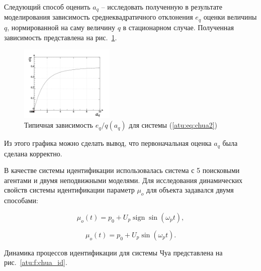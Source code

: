 \documentclass[a4paper,12pt]{article}
\DeclareMathOperator*{\sign}{sign}
\begin{document}
Следующий способ оценить $a_q$ -- исследовать полученную в результате моделирования
зависимость среднеквадратичного отклонения $e_q$ оценки величины $q$, нормированной
на саму величину $q$ в стационарном случае. Полученная зависимость представлена
на рис.~\ref{atu:f:chua_tau}.

\begin{figure}[htb!]
\centerline{
  \includegraphics[width=0.4\textwidth]{p/cha/chua/chua_tau-p_e_a.png}
}
\caption{Типичная зависимость $e_q/q(a_q)$ для системы (\ref{atu:eq:chua2})}
\label{atu:f:chua_tau}
\end{figure}

Из этого графика можно сделать вывод, что первоначальная оценка $a_q$
была сделана корректно.

В качестве системы идентификации использовалась система с 5 поисковыми агентами и
двумя неподвижными моделями. Для исследования динамических свойств системы идентификации
параметр $\mu_o$ для объекта задавался двумя способами:

\begin{equation}
 \mu_o(t) = p_0 + U_p \sign \sin( \omega_p t ),
  \label{atu:eq:chua_mu_sign}
\end{equation}

\begin{equation}
 \mu_o(t) = p_0 + U_p \sin( \omega_p t ).
  \label{atu:eq:chua_mu_sin}
\end{equation}

Динамика процессов идентификации для системы Чуа представлена на рис.~\ref{atu:f:chua_id}.
\end{document}
